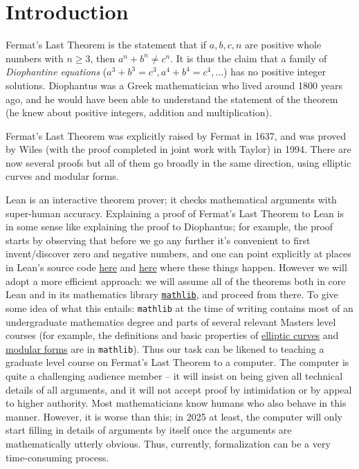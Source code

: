 \chapter{Introduction}

Fermat's Last Theorem is the statement that if $a,b,c,n$ are positive whole numbers with $n\geq 3$,
then $a^n+b^n\not=c^n$. It is thus the claim that a family of \emph{Diophantine equations}
($a^3+b^3=c^3, a^4+b^4=c^4,\ldots$) has no positive integer solutions.
Diophantus was a Greek mathematician who lived around 1800
years ago, and he would have been able to understand the statement of the theorem (he knew about
positive integers, addition and multiplication).

Fermat's Last Theorem was explicitly raised by Fermat in 1637, and was proved by Wiles (with the
proof completed in joint work with Taylor) in 1994. There are now several proofs but all of them
go broadly in the same direction, using elliptic curves and modular forms.

Lean is an interactive theorem prover; it checks mathematical arguments with super-human accuracy.
Explaining a proof of Fermat's Last Theorem to Lean is in some sense like explaining the proof to
Diophantus; for example, the proof starts by observing that before we go any further it's convenient
to first invent/discover zero and negative numbers, and one can point explicitly at places in Lean's
source code \href{https://github.com/leanprover/lean4/blob/260eaebf4e804c9ac1319532970544a4e157c336/src/Init/Prelude.lean#L1049}{here}
and \href{https://github.com/leanprover/lean4/blob/260eaebf4e804c9ac1319532970544a4e157c336/src/Init/Data/Int/Basic.lean#L45}{here}
where these things happen. However we will adopt a more efficient approach: we will assume all of
the theorems both in core Lean and in its mathematics library
\href{https://github.com/leanprover-community/mathlib4}{\tt mathlib}, and proceed from there.
To give some idea of what this entails: {\tt mathlib} at the time of writing contains most of an
undergraduate mathematics degree and parts of several relevant Masters level courses (for example,
the definitions and basic properties of
\href{https://leanprover-community.github.io/mathlib4_docs/Mathlib/AlgebraicGeometry/EllipticCurve/Weierstrass.html}{elliptic curves}
and \href{https://leanprover-community.github.io/mathlib4_docs/Mathlib/NumberTheory/ModularForms/Basic.html}{modular forms}
are in {\tt mathlib}). Thus our task can be likened to teaching a graduate level course on
Fermat's Last Theorem to a computer. The computer is quite a challenging audience member -- it
will insist on being given all technical details of all arguments, and it will not accept proof by
intimidation or by appeal to higher authority. Most mathematicians know humans who also behave
in this manner. However, it is worse than this; in 2025 at least, the computer will only start filling
in details of arguments by itself once the arguments are mathematically utterly obvious.
Thus, currently, formalization can be a very time-consuming process.

